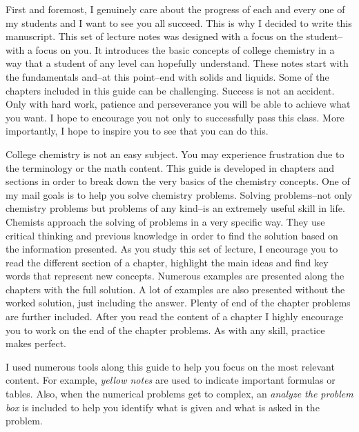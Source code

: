 \documentclass[main.tex]{subfiles}
\begin{document}
\pagestyle{style1}

\begin{fullwidth}
\begin{multicols*}{2}
First and foremost, I genuinely care about the progress of each and every one of my students and I want to see you all succeed. This is why I decided to write this manuscript. This set of lecture notes was designed with a focus on the student--with a focus on you. It introduces the basic concepts of college chemistry in a way that a student of any level can hopefully understand. These notes start with the fundamentals and--at this point--end with solids and liquids. Some of the chapters included in this guide can be challenging. Success is not an accident. Only with hard work, patience and perseverance you will be able to achieve what you want. I hope to encourage you not only to successfully pass this class. More importantly, I hope to inspire you to see that you can do this. 

College chemistry is not an easy subject. You may experience frustration due to the terminology or the math content. This guide is developed in chapters and sections in order to break down the very basics of the chemistry concepts. One of my mail goals is to help you solve chemistry problems. Solving problems--not only chemistry problems but problems of any kind--is an extremely useful skill in life. Chemists approach the solving of problems in a very specific way. They use critical thinking and previous knowledge in order to find the solution based on the information presented. As you study this set of lecture, I encourage you to read the different section of a chapter, highlight the main ideas and find key words that represent new concepts. Numerous examples are presented along the chapters with the full solution. A lot of examples are also presented without the worked solution, just including the answer. Plenty of end of the chapter problems are further included. After you read the content of a chapter I highly encourage you to work on the end of the chapter problems. As with any skill, practice makes perfect.

I used numerous tools along this guide to help you focus on the most relevant content. For example, \emph{yellow notes} are used to indicate important formulas or tables. Also, when the numerical problems get to complex, an \emph{analyze the problem box} is included to help you identify what is given and what is asked in the problem.


\end{multicols*}
\end{fullwidth}
\end{document}
